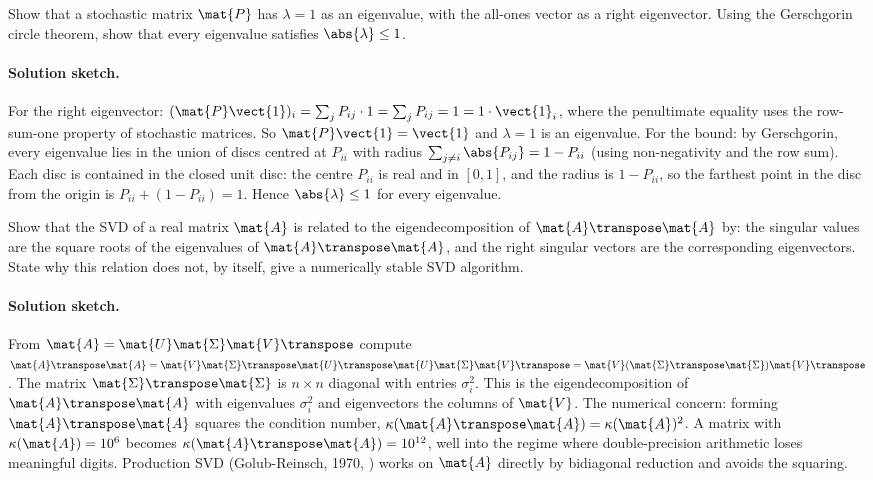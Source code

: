 \begin{exercise}
Show that a stochastic matrix $\mat{P}$ has $\lambda = 1$ as an
eigenvalue, with the all-ones vector as a right eigenvector. Using
the Gerschgorin circle theorem, show that every eigenvalue
satisfies $\abs{\lambda} \leq 1$.
\end{exercise}

\paragraph{Solution sketch.}
For the right eigenvector: $(\mat{P} \vect{1})_{i} = \sum_{j} P_{ij}
\cdot 1 = \sum_{j} P_{ij} = 1 = 1 \cdot \vect{1}_{i}$, where the
penultimate equality uses the row-sum-one property of stochastic
matrices. So $\mat{P} \vect{1} = \vect{1}$ and $\lambda = 1$ is an
eigenvalue. For the bound: by Gerschgorin, every eigenvalue lies in
the union of discs centred at $P_{ii}$ with radius $\sum_{j \neq i}
\abs{P_{ij}} = 1 - P_{ii}$ (using non-negativity and the row sum).
Each disc is contained in the closed unit disc: the centre $P_{ii}$
is real and in $[0, 1]$, and the radius is $1 - P_{ii}$, so the
farthest point in the disc from the origin is $P_{ii} + (1 - P_{ii})
= 1$. Hence $\abs{\lambda} \leq 1$ for every eigenvalue.

\begin{exercise}
Show that the SVD of a real matrix $\mat{A}$ is related to the
eigendecomposition of $\mat{A}\transpose \mat{A}$ by:
the singular values are the square roots of the eigenvalues of
$\mat{A}\transpose \mat{A}$, and the right singular vectors are the
corresponding eigenvectors. State why this relation does not, by
itself, give a numerically stable SVD algorithm.
\end{exercise}

\paragraph{Solution sketch.}
From $\mat{A} = \mat{U} \mat{\Sigma} \mat{V}\transpose$ compute
$\mat{A}\transpose \mat{A} = \mat{V} \mat{\Sigma}\transpose
\mat{U}\transpose \mat{U} \mat{\Sigma} \mat{V}\transpose = \mat{V}
(\mat{\Sigma}\transpose \mat{\Sigma}) \mat{V}\transpose$. The matrix
$\mat{\Sigma}\transpose \mat{\Sigma}$ is $n \times n$ diagonal with
entries $\sigma_{i}^{2}$. This is the eigendecomposition of
$\mat{A}\transpose \mat{A}$ with eigenvalues $\sigma_{i}^{2}$ and
eigenvectors the columns of $\mat{V}$. The numerical concern: forming
$\mat{A}\transpose \mat{A}$ squares the condition number,
$\kappa(\mat{A}\transpose \mat{A}) = \kappa(\mat{A})^{2}$. A matrix
with $\kappa(\mat{A}) = 10^{6}$ becomes $\kappa(\mat{A}\transpose
\mat{A}) = 10^{12}$, well into the regime where double-precision
arithmetic loses meaningful digits. Production SVD (Golub-Reinsch,
1970, \cite{paper:v2ch10-golub-reinsch1970}) works on $\mat{A}$
directly by bidiagonal reduction and avoids the squaring.

